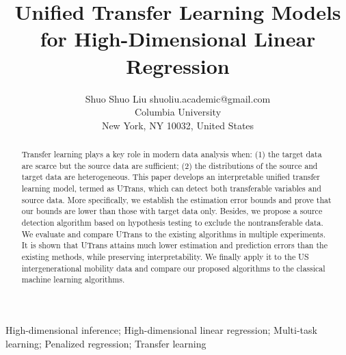 \documentclass[twoside,12pt]{article}
\begin{document}
	
	\title{Unified Transfer Learning Models for High-Dimensional Linear Regression}
	
	\author{\name Shuo Shuo Liu \email shuoliu.academic@gmail.com  
	\\
	\addr 
	Columbia University\\
 New York, NY 10032,
United States
\\}
	
	
	\maketitle
	
	\begin{abstract}
Transfer learning plays a key role in modern data analysis when: (1) the target data are scarce but the source data are sufficient; (2) the distributions of the source and target data are heterogeneous.
This paper develops an interpretable unified transfer learning model, termed as UTrans, which can detect both transferable variables and source data.
More specifically, we establish the estimation error bounds and prove that our bounds are lower than those with target data only.
Besides, we propose a source detection algorithm based on hypothesis testing to exclude the nontransferable data.
We evaluate and compare UTrans to the existing algorithms in multiple experiments.
It is shown that UTrans attains much lower estimation and prediction errors than the existing methods, while preserving interpretability.
We finally apply it to the US intergenerational mobility data and compare our proposed algorithms to the classical machine learning algorithms.

	\end{abstract}
	
	\begin{keywords}
	High-dimensional inference; High-dimensional linear regression; Multi-task learning; Penalized regression; Transfer learning
	\end{keywords}
	
\end{document}
